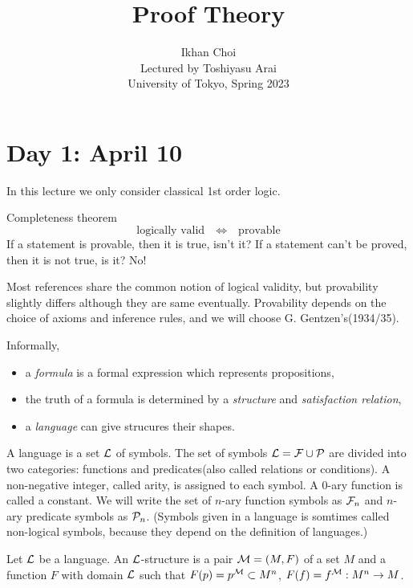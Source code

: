 \documentclass{../../small}
\begin{document}
\title{Proof Theory}
\author{Ikhan Choi\\Lectured by Toshiyasu Arai\\University of Tokyo, Spring 2023}
\maketitle
\tableofcontents

\newpage
\section{Day 1: April 10}

In this lecture we only consider classical 1st order logic.

Completeness theorem
\[\text{logically valid}\quad\Leftrightarrow\quad\text{provable}\]
If a statement is provable, then it is true, isn't it?
If a statement can't be proved, then it is not true, is it?
No!

Most references share the common notion of logical validity, but provability slightly differs although they are same eventually.
Provability depends on the choice of axioms and inference rules, and we will choose G. Gentzen's(1934/35).

Informally,
\begin{itemize}
\item a \emph{formula} is a formal expression which represents propositions,
\item the truth of a formula is determined by a \emph{structure} and \emph{satisfaction relation},
\item a \emph{language} can give strucures their shapes.
\end{itemize}
\begin{defn}
A language is a set $\mathcal{L}$ of symbols.
The set of symbols $\mathcal{L}=\mathcal{F}\cup\mathcal{P}$ are divided into two categories: functions and predicates(also called relations or conditions).
A non-negative integer, called arity, is assigned to each symbol.
A 0-ary function is called a constant.
We will write the set of $n$-ary function symbols as $\mathcal{F}_n$ and $n$-ary predicate symbols as $\mathcal{P}_n$.
(Symbols given in a language is somtimes called non-logical symbols, because they depend on the definition of languages.)
\end{defn}

\begin{defn}
Let $\mathcal{L}$ be a language.
An $\mathcal{L}$-structure is a pair $\mathcal{M}=(M,F)$ of a set $M$ and a function $F$ with domain $\mathcal{L}$ such that $F(p)=p^{\mathcal{M}}\subset M^n$, $F(f)=f^{\mathcal{M}}:M^n\to M$.
\end{defn}
\end{document}
